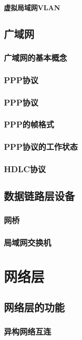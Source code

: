 \documentclass[lang=cn,newtx,10pt,scheme=chinese]{../../elegantbook}
\begin{document}
\subsubsection{虚拟局域网VLAN}

\section{广域网}
\subsection{广域网的基本概念}
\subsection{PPP协议}
\subsection{PPP协议}
\subsection{PPP的帧格式}
\subsection{PPP协议的工作状态}
\subsection{HDLC协议}


\section{数据链路层设备}
\subsection{网桥}
\subsection{局域网交换机}

\chapter{网络层}

\section{网络层的功能}
\subsection{异构网络互连}
\end{document}
